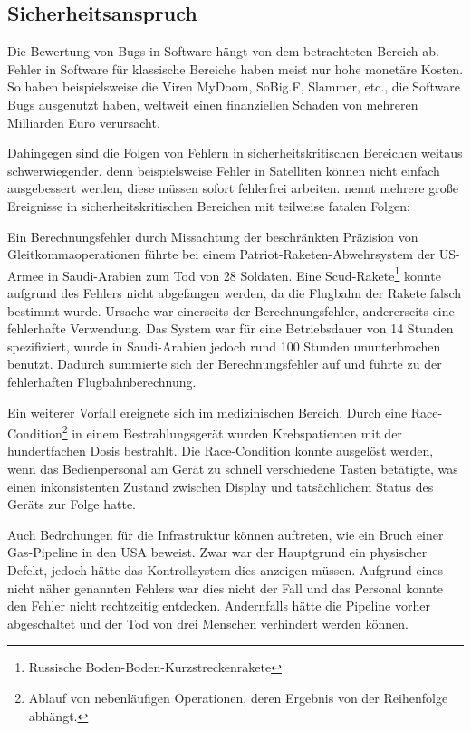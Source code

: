\subsection{Sicherheitsanspruch} %

Die Bewertung von Bugs in Software hängt von dem betrachteten Bereich ab.
Fehler in Software für klassische Bereiche haben meist nur hohe monetäre Kosten.
So haben beispielsweise die Viren MyDoom, SoBig.F, Slammer, etc., die Software Bugs ausgenutzt haben, weltweit einen finanziellen Schaden von mehreren Milliarden Euro verursacht. \parencite[Vgl.][]{ComputerEconomics2004aa}

Dahingegen sind die Folgen von Fehlern in sicherheitskritischen Bereichen weitaus schwerwiegender, denn beispielsweise Fehler in Satelliten können nicht einfach ausgebessert werden, diese müssen sofort fehlerfrei arbeiten.
\parencite[][S. 87 - 89]{Zhivich:2009aa} nennt mehrere große Ereignisse in sicherheitskritischen Bereichen mit teilweise fatalen Folgen:

Ein Berechnungsfehler durch Missachtung der beschränkten Präzision von Gleitkommaoperationen führte bei einem Patriot-Raketen-Abwehrsystem der US-Armee in Saudi-Arabien zum Tod von 28 Soldaten.
Eine Scud-Rakete\footnote{Russische Boden-Boden-Kurzstreckenrakete} konnte aufgrund des Fehlers nicht abgefangen werden, da die Flugbahn der Rakete falsch bestimmt wurde.
Ursache war einerseits der Berechnungsfehler, andererseits eine fehlerhafte Verwendung.
Das System war für eine Betriebsdauer von 14 Stunden spezifiziert, wurde in Saudi-Arabien jedoch rund 100 Stunden ununterbrochen benutzt.
Dadurch summierte sich der Berechnungsfehler auf und führte zu der fehlerhaften Flugbahnberechnung.

Ein weiterer Vorfall ereignete sich im medizinischen Bereich.
Durch eine Race-Condition\footnote{Ablauf von nebenläufigen Operationen, deren Ergebnis von der Reihenfolge abhängt.} in einem Bestrahlungsgerät wurden Krebspatienten mit der hundertfachen Dosis bestrahlt.
Die Race-Condition konnte ausgelöst werden, wenn das Bedienpersonal am Gerät zu schnell verschiedene Tasten betätigte, was einen inkonsistenten Zustand zwischen Display und tatsächlichem Status des Geräts zur Folge hatte.

Auch Bedrohungen für die Infrastruktur können auftreten, wie ein Bruch einer Gas-Pipeline in den USA beweist.
Zwar war der Hauptgrund ein physischer Defekt, jedoch hätte das Kontrollsystem dies anzeigen müssen.
Aufgrund eines nicht näher genannten Fehlers war dies nicht der Fall und das Personal konnte den Fehler nicht rechtzeitig entdecken.
Andernfalls hätte die Pipeline vorher abgeschaltet und der Tod von drei Menschen verhindert werden können.

